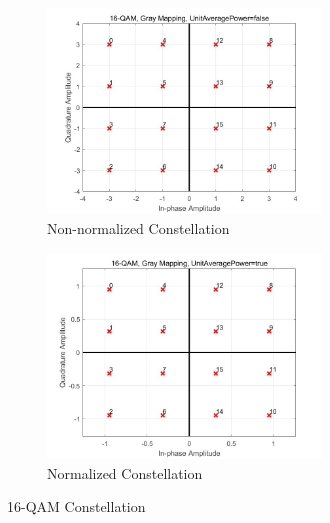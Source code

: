 \documentclass{article}
\begin{document}
\begin{figure}[H]
	\centering
	\begin{subfigure}{0.5\textwidth}
		\centerline{\includegraphics[width=0.8\textwidth]{16qamnonunit.jpg}}
		\caption{Non-normalized Constellation}
	\end{subfigure}%
	\begin{subfigure}{0.5\textwidth}
		\centerline{\includegraphics[width=0.8\textwidth]{16qamunit.jpg}}
		\caption{Normalized Constellation}
	\end{subfigure}
	\caption{16-QAM Constellation}
\end{figure}
\end{document}
